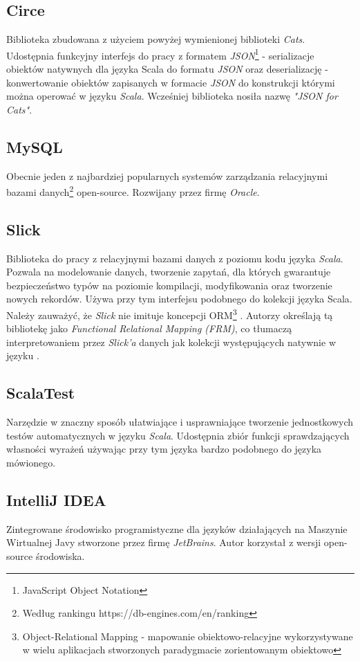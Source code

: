 \documentclass[../main.tex]{subfiles}
\begin{document}
\subsection{Circe}
Biblioteka zbudowana z użyciem powyżej wymienionej biblioteki \textit{Cats}. Udostępnia funkcyjny interfejs do pracy z formatem \textit{JSON}\footnote{JavaScript Object Notation} - serializacje obiektów natywnych dla języka Scala do formatu \textit{JSON} oraz deserializację - konwertowanie obiektów zapisanych w formacie \textit{JSON} do konstrukcji którymi można operować w języku \textit{Scala}. Wcześniej biblioteka nosiła nazwę \textit{"JSON for Cats"}.

\subsection{MySQL}
Obecnie jeden z najbardziej popularnych systemów zarządzania relacyjnymi bazami danych\footnote{Według rankingu https://db-engines.com/en/ranking} open-source. Rozwijany przez firmę \textit{Oracle}.

\subsection{Slick}
Biblioteka do pracy z relacyjnymi bazami danych z poziomu kodu języka \textit{Scala}. Pozwala na modelowanie danych, tworzenie zapytań, dla których gwarantuje bezpieczeństwo typów na poziomie kompilacji, modyfikowania oraz tworzenie nowych rekordów. Używa przy tym interfejsu podobnego do kolekcji języka Scala. Należy zauważyć, że \textit{Slick} nie imituje koncepcji ORM\footnote{Object-Relational Mapping - mapowanie obiektowo-relacyjne wykorzystywane w wielu aplikacjach stworzonych paradygmacie zorientowanym obiektowo} \cite{BOOK:EssentialSlick}. Autorzy określają tą bibliotekę jako \textit{Functional Relational Mapping (FRM)}, co tłumaczą interpretowaniem przez \textit{Slick'a} danych jak kolekcji występujących natywnie w języku \cite{WEBSITE:SlickDocs}.

\subsection{ScalaTest}
Narzędzie w znaczny sposób ułatwiające i usprawniające tworzenie jednostkowych testów automatycznych w języku \textit{Scala}. Udostępnia zbiór funkcji sprawdzających własności wyrażeń używając przy tym języka bardzo podobnego do języka mówionego.

\subsection{IntelliJ IDEA}
Zintegrowane środowisko programistyczne dla języków działających na Maszynie Wirtualnej Javy stworzone przez firmę \textit{JetBrains}. Autor korzystał z wersji open-source środowiska.
\end{document}
